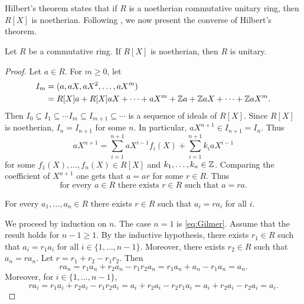 \chapter{}




Hilbert's theorem states that 
if $R$ is a noetherian 
commutative unitary ring, then
$R[X]$ is noetherian. Following \cite{MR212007}, 
we now present the converse of Hilbert's theorem. 

\begin{theorem}[Gilmer]
    Let $R$ be a commutative ring. If $R[X]$ is noetherian, 
    then $R$ is unitary. 
\end{theorem}

\begin{proof}
    Let $a\in R$. For $m\geq0$, let
    \begin{align*}
    I_m&=(a,aX,aX^2,\dots,aX^m)\\
    &=R[X]a+R[X]aX+\cdots+aX^m+\mathbb{Z} a+\mathbb{Z} aX+\cdots+\mathbb{Z} aX^m.
    \end{align*}
    Then $I_0\subseteq I_1\subseteq\cdots I_m\subseteq I_{m+1}\subseteq\cdots$ 
    is a sequence of ideals of $R[X]$. Since $R[X]$ is noetherian,
    $I_n=I_{n+1}$ for some $n$. In particular, 
    $aX^{n+1}\in I_{n+1}=I_n$. Thus
    \[
    aX^{n+1}=\sum_{i=1}^{n+1} aX^{i-1}f_i(X)+\sum_{i=1}^{n+1} k_iaX^{i-1}
    \]
    for some $f_1(X),\dots,f_n(X)\in R[X]$ and 
    $k_1,\dots,k_n\in\mathbb{Z}$. Comparing the coefficient of $X^{n+1}$ 
    one gets that $a=ar$ for some $r\in R$. 
    Thus  
    \begin{equation}
        \label{eq:Gilmer}
        \text{for every $a\in R$ there exists $r\in R$ 
    such that $a=ra$.}
    \end{equation}
    
    \begin{claim}
        For every $a_1,\dots,a_n\in R$ there exists $r\in R$ 
        such that $a_i=ra_i$ for all $i$. 
    \end{claim}
    
    We proceed by induction on $n$. 
    The case $n=1$ is \eqref{eq:Gilmer}. Assume 
    that the result holds for $n-1\geq1$. By the inductive hypothesis, 
    there exists $r_1\in R$ such that $a_i=r_1a_i$ 
    for all $i\in\{1,\dots,n-1\}$. Moreover, 
    there exists $r_2\in R$ such that $a_n=ra_n$. 
    Let $r=r_1+r_2-r_1r_2$. Then
    \[
    ra_n=r_1a_n+r_2a_n-r_1r_2a_n=r_1a_n+a_n-r_1a_n=a_n.
    \]
    Moreover, for $i\in\{1,\dots,n-1\}$, 
    \[
    ra_i=r_1a_i+r_2a_i-r_1r_2a_i=a_i+r_2a_i-r_2r_1a_i=a_i+r_2a_i-r_2a_i=a_i.
    \]
    

\end{proof}
